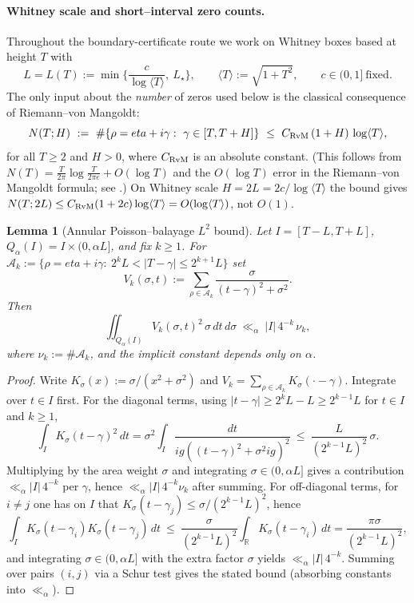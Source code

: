 \documentclass[11pt]{amsart}
\newtheorem{lemma}[theorem]{Lemma}
\theoremstyle{definition}
\theoremstyle{remark}
\newcommand{\R}{\mathbb{R}}
\newcommand{\angles}[1]{\langle #1\rangle}
\begin{document}
\paragraph{Whitney scale and short--interval zero counts.}
Throughout the boundary-certificate route we work on Whitney boxes based at height \(T\) with
\[
  L=L(T):=\min\Big\{\frac{c}{\log\angles{T}},\ L_\star\Big\},\qquad
  \angles{T}:=\sqrt{1+T^2},\qquad c\in(0,1]\ \text{fixed}.
\]
The only input about the \emph{number} of zeros used below is the classical consequence of Riemann--von Mangoldt:
\begin{equation}\label{eq:RvM-short}
  N(T;H)\ :=\ \#\{\rho=eta+i\gamma:\ \gamma\in[T,T+H]\}\ \le\ C_{\rm RvM}\,(1+H)\,\log\angles{T},
\end{equation}
for all \(T\ge 2\) and \(H>0\), where \(C_{\rm RvM}\) is an absolute constant.
(This follows from \(N(T)=\frac{T}{2\pi}\log\frac{T}{2\pi e}+O(\log T)\) and the
\(O(\log T)\) error in the Riemann--von Mangoldt formula; see \cite{Titchmarsh}.)
On Whitney scale \(H=2L=2c/\log\angles{T}\) the bound gives
\(N(T;2L)\le C_{\rm RvM}(1+2c)\log\angles{T}=O(\log\angles{T})\),
not \(O(1)\).
\begin{lemma}[Annular Poisson--balayage \(L^2\) bound]\label{lem:annular-balayage}
Let \(I=[T-L,T+L]\), \(Q_\alpha(I)=I\times(0,\alpha L]\), and fix \(k\ge 1\).
For
\(
\mathcal A_k:=\{\rho=eta+i\gamma:\ 2^kL<|T-\gamma|\le 2^{k+1}L\}
\)
set
\[
  V_k(\sigma,t):=\sum_{\rho\in\mathcal A_k}\frac{\sigma}{(t-\gamma)^2+\sigma^2}.
\]
Then
\[
  \iint_{Q_\alpha(I)} V_k(\sigma,t)^2\,\sigma\,dt\,d\sigma\ \ll_\alpha\ |I|\,4^{-k}\,\nu_k,
\]
where \(\nu_k:=\#\mathcal A_k\), and the implicit constant depends only on \(\alpha\).
\end{lemma}
\begin{proof}
Write \(K_\sigma(x):=\sigma/(x^2+\sigma^2)\) and \(V_k=\sum_{\rho\in\mathcal A_k}K_\sigma(\cdot-\gamma)\).
Integrate over \(t\in I\) first.
For the diagonal terms, using \(|t-\gamma|\ge 2^kL-L\ge 2^{k-1}L\) for \(t\in I\) and \(k\ge 1\),
\[
 \int_I K_\sigma(t-\gamma)^2\,dt
 = \sigma^2\!\int_I \frac{dt}{ig((t-\gamma)^2+\sigma^2ig)^2}
 \ \le\ \frac{L}{(2^{k-1}L)^2}\,\sigma.
\]
Multiplying by the area weight \(\sigma\) and integrating \(\sigma\in(0,\alpha L]\) gives a contribution \(\ll_\alpha |I|\,4^{-k}\) per \(\gamma\), hence \(\ll_\alpha |I|\,4^{-k}\nu_k\) after summing.
For off-diagonal terms, for \(i\ne j\) one has on \(I\) that \(K_\sigma(t-\gamma_j)\le \sigma/(2^{k-1}L)^2\), hence
\[
 \int_I K_\sigma(t-\gamma_i)K_\sigma(t-\gamma_j)\,dt
 \ \le\ \frac{\sigma}{(2^{k-1}L)^2}\int_\R K_\sigma(t-\gamma_i)\,dt
 = \frac{\pi\sigma}{(2^{k-1}L)^2},
\]
and integrating \(\sigma\in(0,\alpha L]\) with the extra factor \(\sigma\) yields \(\ll_\alpha |I|\,4^{-k}\).
Summing over pairs \((i,j)\) via a Schur test gives the stated bound (absorbing constants into \(\ll_\alpha\)).
\end{proof}
\end{document}
